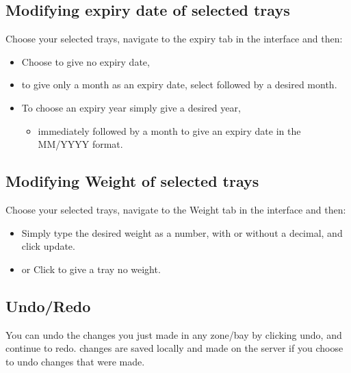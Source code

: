 \documentclass[letterpaper,10pt,english]{sphinxmanual}
\let\oldsubsection\subsection
\renewcommand{\subsection}{\needspace{6\baselineskip}\oldsubsection}
\begin{document}
\subsection{Modifying expiry date of selected trays}
\label{\detokenize{docs/ui/stocktaking:modifying-expiry-date-of-selected-trays}}
Choose your selected trays, navigate to the expiry tab in the interface
and then:
\begin{itemize}
\item {} 
Choose  to give no expiry date,

\item {} 
to give only a month as an expiry date, select  followed by a
desired month.

\item {} 
To choose an expiry year simply give a desired year,
\begin{itemize}
\item {} 
immediately followed by a month to give an expiry date in the
MM/YYYY format.

\end{itemize}

\end{itemize}


\subsection{Modifying Weight of selected trays}
\label{\detokenize{docs/ui/stocktaking:modifying-weight-of-selected-trays}}
Choose your selected trays, navigate to the Weight tab in the interface
and then:
\begin{itemize}
\item {} 
Simply type the desired weight as a number, with or without a
decimal, and click update.

\item {} 
or Click  to give a tray no weight.

\end{itemize}


\subsection{Undo/Redo}
\label{\detokenize{docs/ui/stocktaking:undo-redo}}
You can undo the changes you just made in any zone/bay by clicking undo,
and continue to redo. changes are saved locally and made on the server
if you choose to undo changes that were made.
\end{document}
